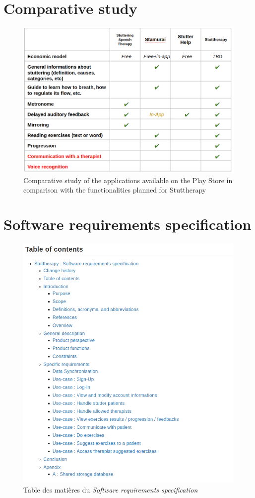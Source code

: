 \begin{appendices}
\chapter{Comparative study}
\label{appendix:market}
\begin{figure}[h]
  \includegraphics[width=1\linewidth]{content/imgs/market.png}
  \caption*{Comparative study of the applications available on the Play Store in comparison with the functionalities planned for Stuttherapy}
\end{figure}



\chapter{Software requirements specification}
\label{appendix:srs}
\begin{figure}[h]
  \includegraphics[width=0.7\linewidth]{content/imgs/srs_contents.png}
  \caption*{Table des matières du \textit{Software requirements specification}}
\end{figure}


\end{appendices}
